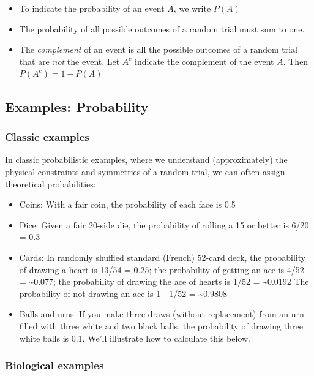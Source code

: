 \documentclass[]{book}
\theoremstyle{definition}
\theoremstyle{definition}
\theoremstyle{definition}
\theoremstyle{remark}
\begin{document}
\begin{itemize}
\item
  To indicate the probability of an event \(A\), we write \(P(A)\)
\item
  The probability of all possible outcomes of a random trial must sum to
  one.
\item
  The \emph{complement} of an event is all the possible outcomes of a
  random trial that are \emph{not} the event. Let \(A^c\) indicate the
  complement of the event \(A\). Then \(P(A^c) = 1 - P(A)\)
\end{itemize}

\hypertarget{examples-probability}{%
\subsection{Examples: Probability}\label{examples-probability}}

\hypertarget{classic-examples}{%
\subsubsection{Classic examples}\label{classic-examples}}

In classic probabilistic examples, where we understand (approximately)
the physical constraints and symmetries of a random trial, we can often
assign theoretical probabilities:

\begin{itemize}
\item
  Coins: With a fair coin, the probability of each face is 0.5
\item
  Dice: Given a fair 20-side die, the probability of rolling a 15 or
  better is 6/20 = 0.3
\item
  Cards: In randomly shuffled standard (French) 52-card deck, the
  probability of drawing a heart is 13/54 = 0.25; the probability of
  getting an ace is 4/52 = \textasciitilde{}0.077; the probability of
  drawing the ace of hearts is 1/52 = \textasciitilde{}0.0192 The
  probability of not drawing an ace is 1 - 1/52 =
  \textasciitilde{}0.9808
\item
  Balls and urns: If you make three draws (without replacement) from an
  urn filled with three white and two black balls, the probability of
  drawing three white balls is 0.1. We'll illustrate how to calculate
  this below.
\end{itemize}

\hypertarget{biological-examples}{%
\subsubsection{Biological examples}\label{biological-examples}}
\end{document}
